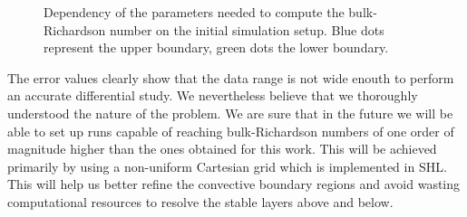 \begin{figure}[t!]
  \centering
      \hfill
	\hfill
	\caption{Dependency of the parameters needed to compute the bulk-Richardson number on the initial simulation setup. Blue dots represent the upper boundary, green dots the lower boundary.}
	\label{fig:diffparam}
\end{figure}

The error values clearly show that the data range is not wide enouth to perform an accurate differential study. We nevertheless believe that we thoroughly understood the nature of the problem. We are sure that in the future we will be able to set up runs capable of reaching bulk-Richardson numbers of one order of magnitude higher than the ones obtained for this work. This will be achieved primarily by using a non-uniform Cartesian grid which is implemented in SHL. This will help us better refine the convective boundary regions and avoid wasting computational resources to resolve the stable layers above and below.

